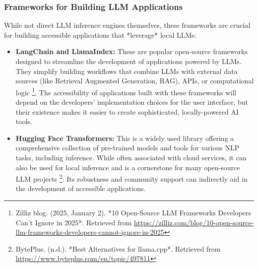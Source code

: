 \subsubsection{Frameworks for Building LLM Applications}
While not direct LLM inference engines themselves, these frameworks are crucial for building accessible applications that *leverage* local LLMs:
\begin{itemize}

    \item \textbf{LangChain and LlamaIndex:} These are popular open-source frameworks designed to streamline the development of applications powered by LLMs. They simplify building workflows that combine LLMs with external data sources (like Retrieval Augmented Generation, RAG), APIs, or computational logic \footnote{Zilliz blog. (2025, January 2). *10 Open-Source LLM Frameworks Developers Can't Ignore in 2025*. Retrieved from \url{https://zilliz.com/blog/10-open-source-llm-frameworks-developers-cannot-ignore-in-2025}}. The accessibility of applications built with these frameworks will depend on the developers' implementation choices for the user interface, but their existence makes it easier to create sophisticated, locally-powered AI tools.

    \item \textbf{Hugging Face Transformers:} This is a widely used library offering a comprehensive collection of pre-trained models and tools for various NLP tasks, including inference. While often associated with cloud services, it can also be used for local inference and is a cornerstone for many open-source LLM projects \footnote{BytePlus. (n.d.). *Best Alternatives for llama.cpp*. Retrieved from \url{https://www.byteplus.com/en/topic/497811}}. Its robustness and community support can indirectly aid in the development of accessible applications.

\end{itemize}


